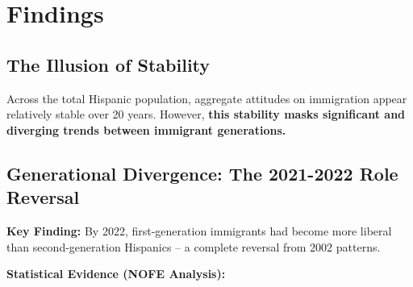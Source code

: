 \documentclass[11pt,letterpaper]{article}
\begin{document}
\section{Findings}

\subsection{The Illusion of Stability}

Across the total Hispanic population, aggregate attitudes on immigration appear relatively stable over 20 years. However, \textbf{this stability masks significant and diverging trends between immigrant generations.}

\subsection{Generational Divergence: The 2021-2022 Role Reversal}

\textbf{Key Finding:} By 2022, first-generation immigrants had become more liberal than second-generation Hispanics -- a complete reversal from 2002 patterns.

\textbf{Statistical Evidence (NOFE Analysis):}
\end{document}
